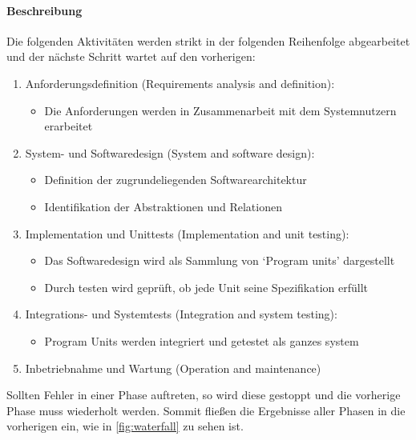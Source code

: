 \documentclass[ngerman,color=3b]{tuda_summary}
\begin{document}
\paragraph{Beschreibung}
Die folgenden Aktivitäten werden strikt in der folgenden Reihenfolge abgearbeitet und der nächste Schritt wartet auf den vorherigen:
\begin{enumerate}
    \item Anforderungsdefinition (Requirements analysis and definition):\begin{itemize}
              \item Die Anforderungen werden in Zusammenarbeit mit dem Systemnutzern erarbeitet
          \end{itemize}
    \item System- und Softwaredesign (System and software design):\begin{itemize}
              \item Definition der zugrundeliegenden Softwarearchitektur
              \item Identifikation der Abstraktionen und Relationen
          \end{itemize}
    \item Implementation und Unittests (Implementation and unit
          testing):\begin{itemize}
              \item Das Softwaredesign wird als Sammlung von \enquote*{Program units} dargestellt
              \item Durch testen wird geprüft, ob jede Unit seine Spezifikation erfüllt
          \end{itemize}
    \item Integrations- und Systemtests (Integration and system
          testing):\begin{itemize}
              \item Program Units werden integriert und getestet als ganzes system
          \end{itemize}
    \item Inbetriebnahme und Wartung (Operation and maintenance)
\end{enumerate}

Sollten Fehler in einer Phase auftreten, so wird diese gestoppt und die vorherige Phase muss wiederholt werden. Sommit fließen die Ergebnisse aller Phasen in die vorherigen ein, wie in \ref{fig:waterfall} zu sehen ist.
\end{document}
